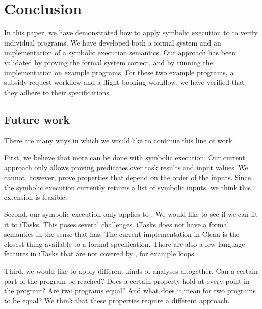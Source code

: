 
\section{Conclusion}

\label{sec:conclusion}

In this paper, we have demonstrated how to apply symbolic execution to \TOPHAT to verify individual programs.
We have developed both a formal system and an implementation of a symbolic execution semantics.
Our approach has been validated by proving the formal system correct, and by running the implementation on example programs.
For these two example programs, a subsidy request workflow and a flight booking workflow, we have verified that they adhere to their specifications.


\subsection{Future work}

There are many ways in which we would like to continue this line of work.

First, we believe that more can be done with symbolic execution.
Our current approach only allows proving predicates over task results and input values.
We cannot, however, prove properties that depend on the order of the inputs.
Since the symbolic execution currently returns a list of symbolic inputs, we think this extension is feasible.

Second, our symbolic execution only applies to \TOPHAT.
We would like to see if we can fit it to iTasks.
This poses several challenges.
iTasks does not have a formal semantics in the sense that \TOPHAT has.
The current implementation in Clean is the closest thing available to a formal specification.
There are also a few language features in iTasks that are not covered by \TOPHAT, for example loops.

Third, we would like to apply different kinds of analyses altogether.
Can a certain part of the program be reached?
Does a certain property hold at every point in the program?
Are two programs equal? And what does it mean for two programs to be equal?
We think that these properties require a different approach.
